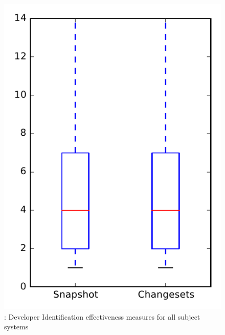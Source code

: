 
\begin{figure}
\centering
\includegraphics[height=0.4\textheight]{figures/dit/rq1_overview_no_outlier}
\caption{\done: Developer Identification effectiveness measures for all subject systems}
\label{fig:dit:rq1:overview}
\end{figure}
